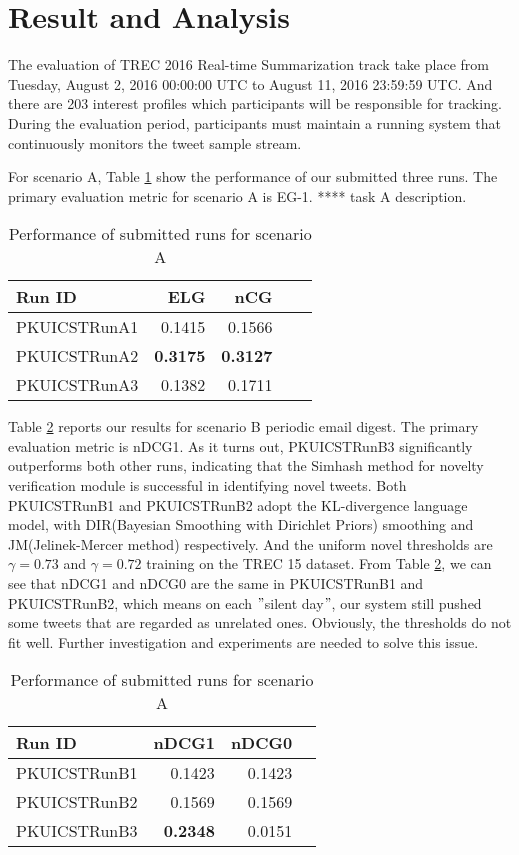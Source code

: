\section{Result and Analysis}
The evaluation of TREC 2016 Real-time Summarization track take place from Tuesday, August 2, 2016 00:00:00 UTC to August 11, 2016 23:59:59 UTC. And there are 203 interest profiles which participants will be responsible for tracking. During the evaluation period, participants must maintain a running system that continuously monitors the tweet sample stream.

For scenario A,  Table \ref{tab:resA} show the performance of our submitted three runs.
The primary evaluation metric for scenario A is EG-1. **** task A description.

\begin{table}[htbp]
\centering
\caption{Performance of submitted runs for scenario A}
\label{tab:resA}
\begin{tabular}{lrrrr}
\hline
Run ID&ELG&nCG\\
\hline
PKUICSTRunA1&0.1415&0.1566\\
PKUICSTRunA2&\textbf{0.3175}&\textbf{0.3127}\\
PKUICSTRunA3&0.1382&0.1711\\
\hline
\end{tabular}
\end{table}

Table \ref{tab:resB} reports our results for scenario B periodic email digest. The primary evaluation metric is nDCG1. As it turns out, PKUICSTRunB3 significantly outperforms both other runs, indicating that the Simhash method for novelty verification module is successful in identifying novel tweets. Both PKUICSTRunB1 and PKUICSTRunB2 adopt the KL-divergence language model, with DIR(Bayesian Smoothing with Dirichlet Priors) smoothing and JM(Jelinek-Mercer method) respectively. And the uniform novel thresholds are $\gamma=0.73$ and $\gamma=0.72$ training on the TREC 15 dataset. From Table \ref{tab:resB}, we can see that nDCG1 and nDCG0 are the same in PKUICSTRunB1 and PKUICSTRunB2, which means on each $"$silent day$"$, our system still pushed some tweets that are regarded as unrelated ones. Obviously, the thresholds do not fit well. Further investigation and experiments are needed to solve this issue.

\begin{table}[htbp]
\centering
\caption{Performance of submitted runs for scenario A}
\label{tab:resB}
\begin{tabular}{lrrr}
\hline
Run ID&nDCG1&nDCG0\\
\hline
PKUICSTRunB1&0.1423&0.1423\\
PKUICSTRunB2&0.1569&0.1569\\
PKUICSTRunB3&\textbf{0.2348}&0.0151\\
\hline
\end{tabular}
\end{table}

